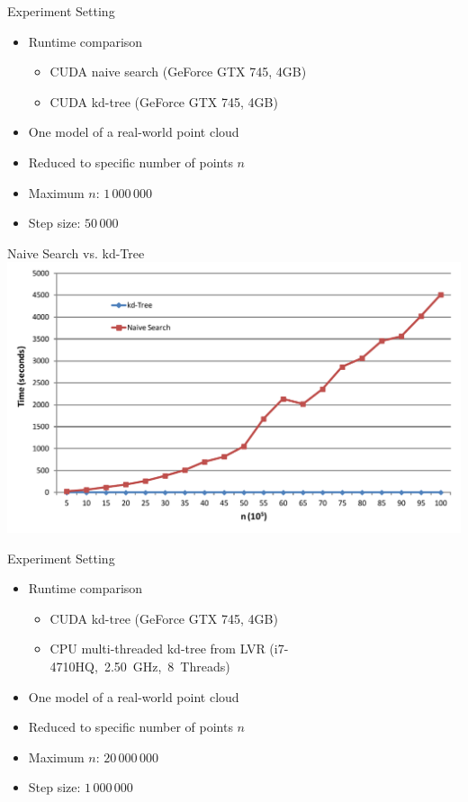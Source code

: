 \documentclass{beamer}
\begin{document}
\begin{frame}{Experiment Setting}
	\begin{itemize}
		\item Runtime comparison
		\begin{itemize}
			\item CUDA naive search (GeForce GTX 745, 4GB)
			\item CUDA kd-tree (GeForce GTX 745, 4GB)
		\end{itemize}
		\item One model of a real-world point cloud
		\item Reduced to specific number of points $n$
		\item Maximum $n$: $1\,000\,000$
		\item Step size: $50\,000$
	\end{itemize}
\end{frame}

\begin{frame}{Naive Search vs. kd-Tree}
	\includegraphics[width=1.0\textwidth]{plot_1.pdf}
\end{frame}

\begin{frame}{Experiment Setting}
	\begin{itemize}
		\item Runtime comparison
		\begin{itemize}
			\item CUDA kd-tree (GeForce GTX 745, 4GB)
			\item CPU multi-threaded kd-tree from LVR \mbox{(i7-4710HQ, 2.50 GHz, 8 Threads)}
		\end{itemize}
		\item One model of a real-world point cloud
		\item Reduced to specific number of points $n$
		\item Maximum $n$: $20\,000\,000$
		\item Step size: $1\,000\,000$
	\end{itemize}
\end{frame}
\end{document}
